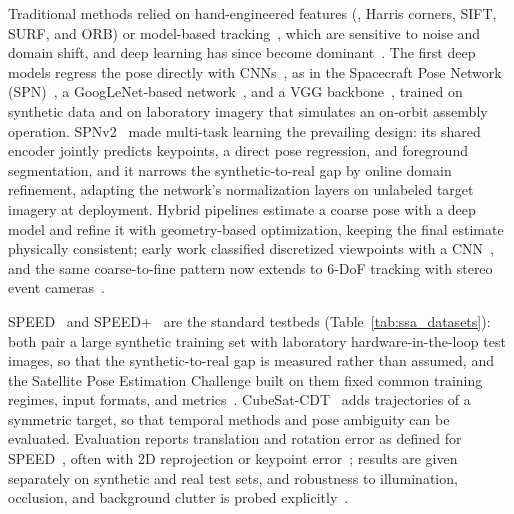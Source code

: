 Traditional methods relied on hand-engineered features (\eg, Harris corners, SIFT, SURF, and ORB) or model-based tracking~\cite{d2014poseestimationuncooperativespacecraft}, which are sensitive to noise and domain shift, and deep learning has since become dominant~\cite{proencca2020deepURSO}.
The first deep models regress the pose directly with CNNs~\cite{garcia2021lspnet}, as in the Spacecraft Pose Network (SPN)~\cite{sharma2020neuralposeestimation}, a GoogLeNet-based network~\cite{phisannupawong2020vision}, and a VGG backbone~\cite{sonawani2020assistive}, trained on synthetic data and on laboratory imagery that simulates an on-orbit assembly operation.
SPNv2~\cite{park2024robustspacecraftposeestimation} made multi-task learning the prevailing design: its shared encoder jointly predicts keypoints, a direct pose regression, and foreground segmentation, and it narrows the synthetic-to-real gap by online domain refinement, adapting the network's normalization layers on unlabeled target imagery at deployment.
Hybrid pipelines estimate a coarse pose with a deep model and refine it with geometry-based optimization, keeping the final estimate physically consistent; early work classified discretized viewpoints with a CNN~\cite{sharma2018pose}, and the same coarse-to-fine pattern now extends to 6-DoF tracking with stereo event cameras~\cite{liu2025stereo}.

SPEED~\cite{Sharma2019SpacecraftPE} and SPEED+~\cite{park2022speed+} are the standard testbeds (Table~\ref{tab:ssa_datasets}): both pair a large synthetic training set with laboratory hardware-in-the-loop test images, so that the synthetic-to-real gap is measured rather than assumed, and the Satellite Pose Estimation Challenge built on them fixed common training regimes, input formats, and metrics~\cite{kisantal2020satellitechallenge}.
CubeSat-CDT~\cite{musallam2022cubesatcdt} adds trajectories of a symmetric target, so that temporal methods and pose ambiguity can be evaluated.
Evaluation reports translation and rotation error as defined for SPEED~\cite{Sharma2019SpacecraftPE}, often with 2D reprojection or keypoint error~\cite{garcia2021lspnet}; results are given separately on synthetic and real test sets, and robustness to illumination, occlusion, and background clutter is probed explicitly~\cite{park2024robustspacecraftposeestimation}.

